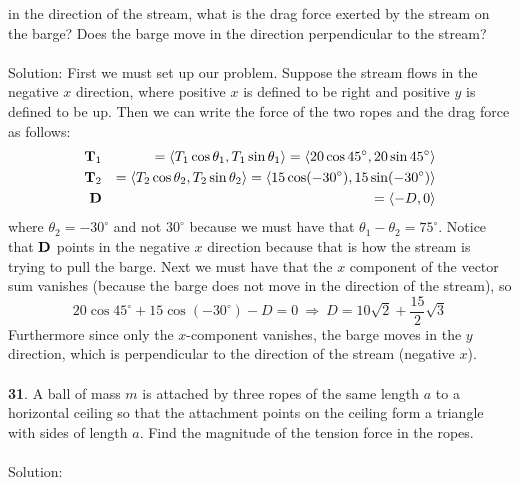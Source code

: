 \documentclass[12pt]{amsbook}
\newcommand{\la}{\langle}
\newcommand{\ra}{\rangle}
\begin{document}
in the direction of the stream,
what is the drag force exerted by the stream on the barge?  
Does the barge move in the direction perpendicular to the stream?\\
\\
{\sc Solution}: First we must set up our problem. Suppose the stream flows in the negative $x$ direction, where positive $x$ is defined to be right and positive $y$ is defined to be up. Then we can write the force of the two ropes and the drag force as follows:
\begin{eqnarray*}
{\bf T}_1&&=\la T_1\cos\theta_1,T_1\sin\theta_1 \ra = \la 20\cos45^\circ,20\sin45^\circ \ra\\
{\bf T}_2&&=\la T_2\cos\theta_2,T_2\sin\theta_2 \ra = \la 15\cos(-30^\circ),15\sin(-30^\circ) \ra\\
{\bf D}&&=\la -D,0\ra
\end{eqnarray*}
where $\theta_2=-30^\circ$ and not $30^\circ$ because we must have that $\theta_1-\theta_2=75^\circ$. Notice that $\bf D$ points in the negative $x$ direction because that is how the stream is trying to pull the barge. Next we must have that the $x$ component of the vector sum vanishes (because the barge does not move in the direction of the stream), so
$$20\cos45^\circ+15\cos(-30^\circ)-D=0 \ \Rightarrow \ D=10\sqrt{2}+\frac{15}{2}\sqrt{3}$$
Furthermore since only the $x$-component vanishes, the barge moves in the $y$ direction, which is perpendicular to the direction of the stream (negative $x$). 
\\
\\
{\small\bf 31}. A ball of mass $m$ is attached by three ropes
of the same length $a$ to a horizontal ceiling so that 
the attachment points on the ceiling form a triangle 
with sides of length $a$. Find the magnitude of the tension
force in the ropes.\\
\\
{\sc Solution}:
\end{document}
